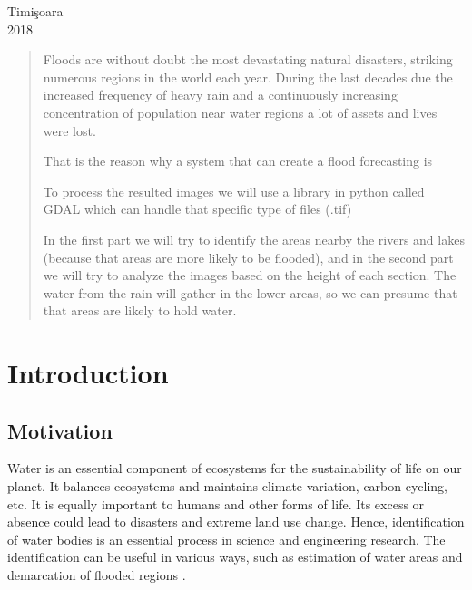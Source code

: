 \documentclass[12pt, a4paper]{report}
\begin{document}
\begin{titlepage}
\vfill
{\large Timi\c{s}oara\\ 2018}\\ %

 


\end{titlepage}

\begin{abstract} %
\vspace{1.0cm}



Floods are without doubt the most devastating natural disasters, striking numerous regions in the world each year. During the last decades due the increased frequency of heavy rain and a continuously increasing concentration of population near water regions a lot of assets and lives were lost.

That is the reason why a system that can create a flood forecasting is  

To process the resulted images we will use a library in python called GDAL which can handle that specific type of files (.tif)

In the first part we will try to identify the areas nearby the rivers and lakes (because that areas are more likely to be flooded), and in the second part we will try to analyze the images based on the height of each section. The water from the rain will gather in the lower areas, so we can presume that that areas are likely to hold water.

\end{abstract} %


\newpage{}

\chapter{Introduction} 

\setcounter{page}{1}


\section{Motivation}
\quad
Water is an essential component of ecosystems for the sustainability of life on our planet. It balances ecosystems and maintains climate variation, carbon cycling, etc. It is equally important to humans and other forms of life. Its excess or absence could lead to disasters and extreme land use change. Hence, identification of water bodies is an essential process in science and engineering research. The identification can be useful in various ways, such as estimation of water areas and demarcation of flooded regions \cite {Rover, Alsdorf}.
\par 
\end{document}
